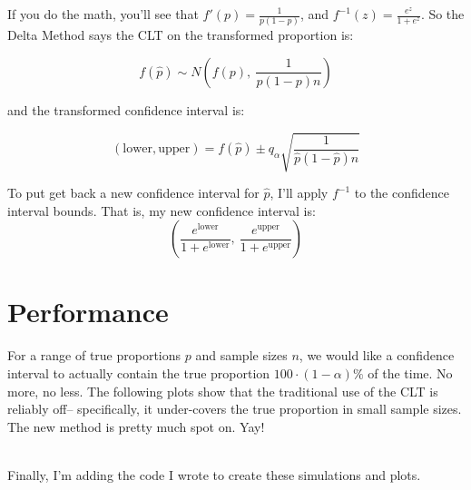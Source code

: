 \documentclass{article}
\begin{document}
\newpage
If you do the math, you'll see that $f'(p) = \frac{1}{p(1-p)}$, and $f^{-1}(z) = \frac{e^z}{1+e^z}$. So the Delta Method says the CLT on the transformed proportion is:

$$f(\hat{p}) \sim N\left(f(p),\ \frac{1}{p(1-p)n}\right)$$

and the transformed confidence interval is:

$$(\text{lower}, \text{upper}) = f(\hat{p}) \pm q_\alpha\sqrt{\frac{1}{\hat{p}(1-\hat{p})n}}$$

To put get back a new confidence interval for $\hat{p}$, I'll apply $f^{-1}$ to the confidence interval bounds. That is, my new confidence interval is:$$\left(\frac{e^\text{lower}}{1+e^\text{lower}},\ \frac{e^\text{upper}}{1+e^\text{upper}}\right)$$

\section*{Performance}

For a range of true proportions $p$ and sample sizes $n$, we would like a confidence interval to actually contain the true proportion $100\cdot(1-\alpha)\%$ of the time. No more, no less. The following plots show that the traditional use of the CLT is reliably off-- specifically, it under-covers the true proportion in small sample sizes. The new method is pretty much spot on. Yay!

\ \\
Finally, I'm adding the code I wrote to create these simulations and plots.
\end{document}
